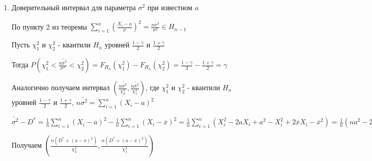 \documentclass[12pt]{article}
\begin{document}
\begin{enumerate}[label*=\Roman*.]
    По пункту 3 из теоремы $\sum_{i = 1}^n \left(\frac{X_i - \overline{x}}{\sigma}\right)^2 = \frac{(n - 1)S^2}{\sigma^2} = 
    \frac{nD^*}{\sigma^2} \in H_{n - 1}$

    Пусть $\chi_1^2$ и $\chi_2^2$ - квантили $H_{n - 1}$ уровней $\frac{1 - \gamma}{2}$ и $\frac{1 + \gamma}{2}$

    Тогда $P\left(\chi_1^2 < \frac{(n - 1)S^2}{\sigma^2} < \chi_2^2\right) = F_{H_{n - 1}}(\chi_1^2) - F_{H_{n - 1}}(\chi_2^2) = \frac{1 - \gamma}{2} - \frac{1 + \gamma}{2} = \gamma$

    $\chi_1^2 < \frac{(n - 1)S^2}{\sigma^2} < \chi_2^2$

    $\frac{1}{\chi_2^2} < \frac{\sigma^2}{(n - 1)S^2} < \frac{1}{\chi_1^2}$

    $\frac{(n - 1)S^2}{\chi_2^2} < \sigma^2 < \frac{(n - 1)S^2}{\chi_1^2}$ или 
    $\frac{nD^*}{\chi_2^2} < \sigma^2 < \frac{nD^*}{\chi_1^2}$

    Получаем интервал $\left(\frac{(n - 1)S^2}{\chi_2^2}, \frac{(n - 1)S^2}{\chi_1^2}\right)$, где $\chi_1^2$ и $\chi_2^2$ - квантили $H_{n - 1}$ уровней $\frac{1 - \gamma}{2}$ и $\frac{1 + \gamma}{2}$

    \Nota Данный интервал не симметричен относительно неизвестного параметра $\sigma^2$

    \item Доверительный интервал для параметра $\sigma^2$ при известном $a$

    По пункту 2 из теоремы $\sum_{i = 1}^n \left(\frac{X_i - a}{\sigma}\right)^2 = \frac{n \tilde{\sigma^2}}{\sigma^2} \in H_{n - 1}$
    
    Пусть $\chi_1^2$ и $\chi_2^2$ - квантили $H_{n}$ уровней $\frac{1 - \gamma}{2}$ и $\frac{1 + \gamma}{2}$

    Тогда $P\left(\chi_1^2 < \frac{n \tilde{\sigma^2}}{\sigma^2} < \chi_2^2\right) = F_{H_{n}}(\chi_1^2) - F_{H_{n}}(\chi_2^2) = \frac{1 - \gamma}{2} - \frac{1 + \gamma}{2} = \gamma$

    Аналогично получаем интервал $\left(\frac{n \tilde{\sigma^2}}{\chi_2^2}, \frac{n \tilde{\sigma^2}}{\chi_1^2}\right)$, 
    где $\chi_1^2$ и $\chi_2^2$ - квантили $H_{n}$ уровней $\frac{1 - \gamma}{2}$ и $\frac{1 + \gamma}{2}$, $n \tilde{\sigma^2} = \sum_{i = 1}^n (X_i - a)^2$

    \Nota $\tilde{\sigma^2} - D^* = \frac{1}{n} \sum_{i = 1}^n (X_i - a)^2 - \frac{1}{n} \sum_{i = 1}^n (X_i - \overline{x})^2 = 
    \frac{1}{n} \sum_{i = 1}^n (X_i^2 - 2aX_i + a^2 - X_i^2 + 2 \overline{x} X_i - \overline{x}^2) = 
    \frac{1}{n} (na^2 - 2a n \overline{x} + 2 \overline{x} \cdot n \overline{x} - n \overline{x}^2) = 
    a^2 - 2a \overline{x} + \overline{x}^2 = (a - \overline{x})^2 \Longrightarrow \tilde{\sigma^2} = D^* + (a - \overline{x})^2$

    Получаем $\left(\frac{n (D^* + (a - \overline{x})^2)}{\chi_2^2}, \frac{n (D^* + (a - \overline{x})^2)}{\chi_1^2}\right)$

\end{enumerate}
\end{document}
